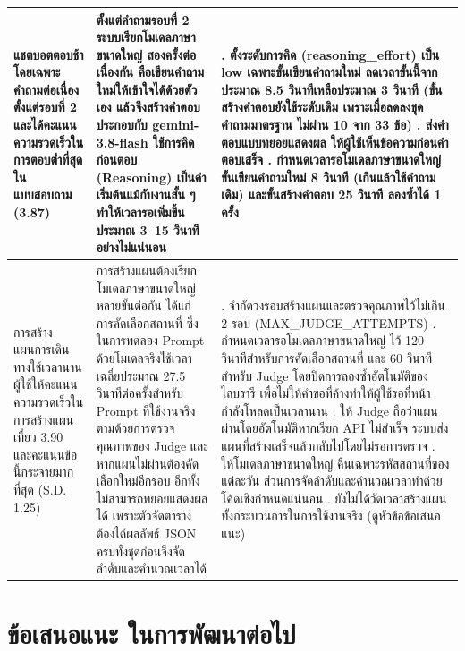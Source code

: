 {\begin{longtable}{|>{\raggedright\arraybackslash}p{2.9cm}|>{\raggedright\arraybackslash}p{4.9cm}|>{\raggedright\arraybackslash}p{5.5cm}|}
\hline
แชตบอตตอบช้า โดยเฉพาะคำถามต่อเนื่องตั้งแต่รอบที่ 2 และได้คะแนนความรวดเร็วในการตอบต่ำที่สุดในแบบสอบถาม (3.87) & ตั้งแต่คำถามรอบที่ 2 ระบบเรียกโมเดลภาษาขนาดใหญ่ สองครั้งต่อเนื่องกัน คือเขียนคำถามใหม่ให้เข้าใจได้ด้วยตัวเอง แล้วจึงสร้างคำตอบ ประกอบกับ gemini-3.8-flash ใช้การคิดก่อนตอบ (Reasoning) เป็นค่าเริ่มต้นแม้กับงานสั้น ๆ ทำให้เวลารอเพิ่มขึ้นประมาณ 3--15 วินาทีอย่างไม่แน่นอน & 1. ตั้งระดับการคิด (reasoning\_effort) เป็น low เฉพาะขั้นเขียนคำถามใหม่ ลดเวลาขั้นนี้จากประมาณ 8.5 วินาทีเหลือประมาณ 3 วินาที (ขั้นสร้างคำตอบยังใช้ระดับเดิม เพราะเมื่อลดลงชุดคำถามมาตรฐาน ไม่ผ่าน 10 จาก 33 ข้อ) \newline 2. ส่งคำตอบแบบทยอยแสดงผล ให้ผู้ใช้เห็นข้อความก่อนคำตอบเสร็จ \newline 3. กำหนดเวลารอโมเดลภาษาขนาดใหญ่ ขั้นเขียนคำถามใหม่ 8 วินาที (เกินแล้วใช้คำถามเดิม) และขั้นสร้างคำตอบ 25 วินาที ลองซ้ำได้ 1 ครั้ง \\
\hline
การสร้างแผนการเดินทางใช้เวลานาน ผู้ใช้ให้คะแนนความรวดเร็วในการสร้างแผนเที่ยว 3.90 และคะแนนข้อนี้กระจายมากที่สุด (S.D. 1.25) & การสร้างแผนต้องเรียกโมเดลภาษาขนาดใหญ่ หลายขั้นต่อกัน ได้แก่ การคัดเลือกสถานที่ ซึ่งในการทดลอง Prompt ด้วยโมเดลจริงใช้เวลาเฉลี่ยประมาณ 27.5 วินาทีต่อครั้งสำหรับ Prompt ที่ใช้งานจริง ตามด้วยการตรวจคุณภาพของ Judge และหากแผนไม่ผ่านต้องคัดเลือกใหม่อีกรอบ อีกทั้งไม่สามารถทยอยแสดงผลได้ เพราะตัวจัดตารางต้องได้ผลลัพธ์ JSON ครบทั้งชุดก่อนจึงจัดลำดับและคำนวณเวลาได้ & 1. จำกัดวงรอบสร้างแผนและตรวจคุณภาพไว้ไม่เกิน 2 รอบ (MAX\_JUDGE\_ATTEMPTS) \newline 2. กำหนดเวลารอโมเดลภาษาขนาดใหญ่ ไว้ 120 วินาทีสำหรับการคัดเลือกสถานที่ และ 60 วินาทีสำหรับ Judge โดยปิดการลองซ้ำอัตโนมัติของไลบรารี เพื่อไม่ให้คำขอที่ค้างทำให้ผู้ใช้รอที่หน้ากำลังโหลดเป็นเวลานาน \newline 3. ให้ Judge ถือว่าแผนผ่านโดยอัตโนมัติหากเรียก API ไม่สำเร็จ ระบบส่งแผนที่สร้างเสร็จแล้วกลับไปโดยไม่รอการตรวจ \newline 4. ให้โมเดลภาษาขนาดใหญ่ คืนเฉพาะรหัสสถานที่ของแต่ละวัน ส่วนการจัดลำดับและคำนวณเวลาทำด้วยโค้ดเชิงกำหนดแน่นอน \newline 5. ยังไม่ได้วัดเวลาสร้างแผนทั้งกระบวนการในการใช้งานจริง (ดูหัวข้อข้อเสนอแนะ) \\
\hline
\end{longtable}
\par}

\section{ข้อเสนอแนะ ในการพัฒนาต่อไป}

